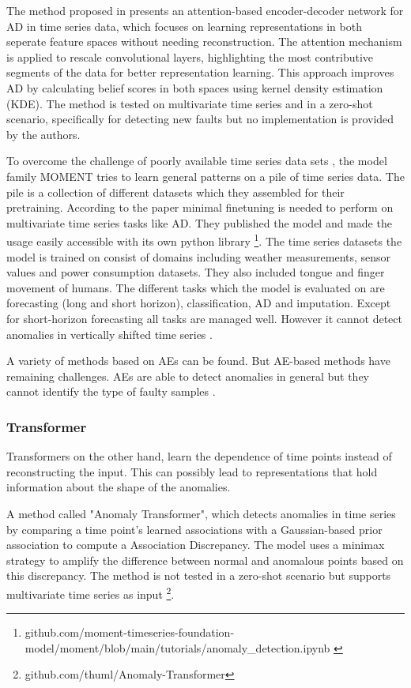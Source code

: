 %
The method proposed in \cite{wang_attention-based_2022} presents an attention-based encoder-decoder network for AD in time series data, which focuses on learning representations in both seperate feature spaces without needing reconstruction. The attention mechanism is applied to rescale convolutional layers, highlighting the most contributive segments of the data for better representation learning. This approach improves AD by calculating belief scores in both spaces using kernel density estimation (KDE). The method is tested on multivariate time series and in a zero-shot scenario, specifically for detecting new faults but no implementation is provided by the authors.

To overcome the challenge of poorly available time series data sets \cite{ma_survey_2023}, the model family MOMENT tries to learn general patterns on a pile of time series data. The pile is a collection of different datasets which they assembled for their pretraining. According to the paper minimal finetuning is needed to perform on multivariate time series tasks like AD. They published the model and made the usage easily accessible with its own python library \footnote{\fussy\tiny github.com/moment-timeseries-foundation-model/moment/blob/main/tutorials/anomaly\_detection.ipynb \label{foot_moment}}. The time series datasets the model is trained on consist of domains including weather measurements, sensor values and power consumption datasets. They also included tongue and finger movement of humans. The different tasks which the model is evaluated on are forecasting (long and short horizon), classification, AD and imputation. Except for short-horizon forecasting all tasks are managed well. However it cannot detect anomalies in vertically shifted time series \cite{goswami_moment_2024}.

A variety of methods based on AEs can be found. But AE-based methods have remaining challenges. AEs are able to detect anomalies in general but they cannot identify the type of faulty samples \cite{zhang_debiased_2024}.

\subsubsection{Transformer}
Transformers on the other hand, learn the dependence of time points instead of reconstructing the input. This can possibly lead to representations that hold information about the shape of the anomalies.

A method called "Anomaly Transformer", which detects anomalies in time series by comparing a time point’s learned associations with a Gaussian-based prior association to compute a Association Discrepancy. The model uses a minimax strategy to amplify the difference between normal and anomalous points based on this discrepancy. The method is not tested in a zero-shot scenario but supports multivariate time series as input \cite{xu_anomaly_2022} \footnote{\fussy\tiny github.com/thuml/Anomaly-Transformer}.


